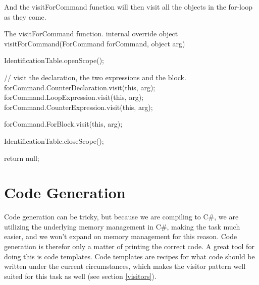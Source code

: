 And the visitForCommand function will then visit all the objects in the for-loop as they come.
\newline
\begin{source}{The visitForCommand function.}{}
internal override object visitForCommand(ForCommand forCommand, object arg)
		{
				IdentificationTable.openScope();

        // visit the declaration, the two expressions and the block.
        forCommand.CounterDeclaration.visit(this, arg);
        forCommand.LoopExpression.visit(this, arg);
        forCommand.CounterExpression.visit(this, arg);

        forCommand.ForBlock.visit(this, arg);

        IdentificationTable.closeScope();
						
        return null;
    }
\end{source}

\section{Code Generation}
Code generation can be tricky, but because we are compiling to C\#, we are utilizing the underlying memory management in C\#, making the task much easier, and we won't expand on memory management for this reason.
Code generation is therefor only a matter of printing the correct code. \newline
A great tool for doing this is code templates. 
Code templates are recipes for what code should be written under the current circumstances, which makes the visitor pattern well suited for this task as well (see section \ref{visitors}).